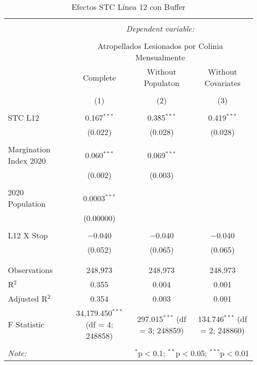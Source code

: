 
\begin{table}[!htbp] \centering 
  \caption{Efectos STC Línea 12 con Buffer} 
  \label{} 
\begin{tabular}{@{\extracolsep{5pt}}lccc} 
\\[-1.8ex]\hline 
\hline \\[-1.8ex] 
 & \multicolumn{3}{c}{\textit{Dependent variable:}} \\ 
\cline{2-4} 
\\[-1.8ex] & \multicolumn{3}{c}{Atropellados Lesionados por Colinia Mensualmente} \\ 
 & Complete & Without Populaton & Without Covariates \\ 
\\[-1.8ex] & (1) & (2) & (3)\\ 
\hline \\[-1.8ex] 
 STC L12 & 0.167$^{***}$ & 0.385$^{***}$ & 0.419$^{***}$ \\ 
  & (0.022) & (0.028) & (0.028) \\ 
  & & & \\ 
 Margination Index 2020 & 0.060$^{***}$ & 0.069$^{***}$ &  \\ 
  & (0.002) & (0.003) &  \\ 
  & & & \\ 
 2020 Population & 0.0003$^{***}$ &  &  \\ 
  & (0.00000) &  &  \\ 
  & & & \\ 
 L12 X Stop & $-$0.040 & $-$0.040 & $-$0.040 \\ 
  & (0.052) & (0.065) & (0.065) \\ 
  & & & \\ 
\hline \\[-1.8ex] 
Observations & 248,973 & 248,973 & 248,973 \\ 
R$^{2}$ & 0.355 & 0.004 & 0.001 \\ 
Adjusted R$^{2}$ & 0.354 & 0.003 & 0.001 \\ 
F Statistic & 34,179.450$^{***}$ (df = 4; 248858) & 297.015$^{***}$ (df = 3; 248859) & 134.746$^{***}$ (df = 2; 248860) \\ 
\hline 
\hline \\[-1.8ex] 
\textit{Note:}  & \multicolumn{3}{r}{$^{*}$p$<$0.1; $^{**}$p$<$0.05; $^{***}$p$<$0.01} \\ 
\end{tabular} 
\end{table} 
